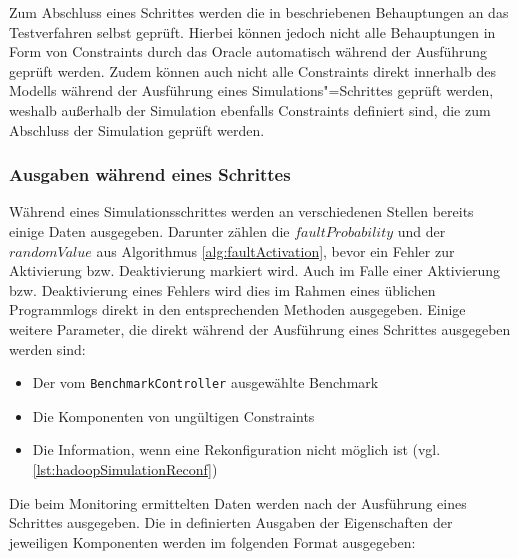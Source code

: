 Zum Abschluss eines Schrittes werden die in  beschriebenen Behauptungen an das Testverfahren selbst geprüft.
Hierbei können jedoch nicht alle Behauptungen in Form von Constraints durch das Oracle automatisch während der Ausführung geprüft werden.
Zudem können auch nicht alle Constraints direkt innerhalb des Modells während der Ausführung eines Simulations"=Schrittes geprüft werden, weshalb außerhalb der Simulation ebenfalls Constraints definiert sind, die zum Abschluss der Simulation geprüft werden.

\subsubsection{Ausgaben während eines Schrittes}\label{sec:simulationStepOutput}

Während eines Simulationsschrittes werden an verschiedenen Stellen bereits einige Daten ausgegeben.
Darunter zählen \zB die $faultProbability$ und der $randomValue$ aus Algorithmus \ref{alg:faultActivation}, bevor ein Fehler zur Aktivierung bzw. Deaktivierung markiert wird.
Auch im Falle einer Aktivierung bzw. Deaktivierung eines Fehlers wird dies im Rahmen eines üblichen Programmlogs direkt in den entsprechenden Methoden ausgegeben.
Einige weitere Parameter, die direkt während der Ausführung eines Schrittes ausgegeben werden sind:

\begin{itemize}
    \item Der vom \texttt{BenchmarkController} ausgewählte Benchmark
    \item Die Komponenten von ungültigen Constraints
    \item Die Information, wenn eine Rekonfiguration nicht möglich ist (vgl. \autoref{lst:hadoopSimulationReconf})
\end{itemize}

Die beim Monitoring ermittelten Daten werden nach der Ausführung eines Schrittes ausgegeben.
Die in  definierten Ausgaben der Eigenschaften der jeweiligen Komponenten werden im folgenden Format ausgegeben:

